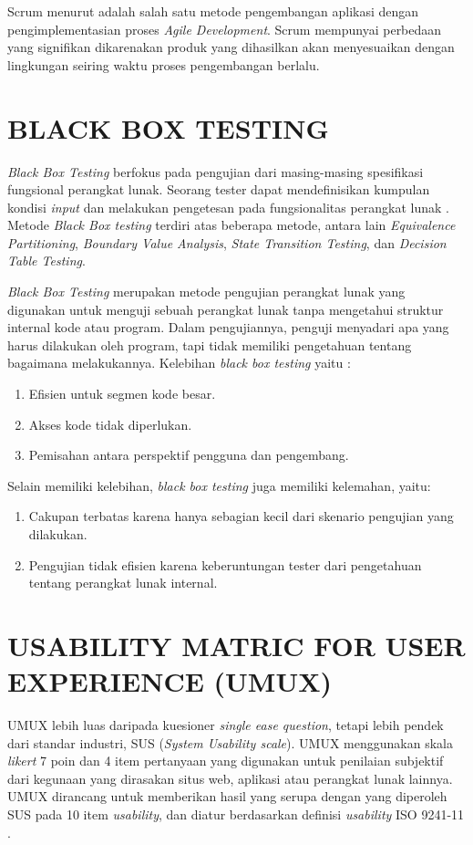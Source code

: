 \par Scrum menurut \citep{wahyudi2018analisis} adalah salah satu metode pengembangan aplikasi dengan pengimplementasian proses \textit{Agile Development}. Scrum mempunyai perbedaan yang signifikan dikarenakan produk yang dihasilkan akan menyesuaikan dengan lingkungan seiring waktu proses pengembangan berlalu.

\section{\uppercase{BLACK BOX TESTING}}
\textit{Black Box Testing} berfokus pada pengujian dari masing-masing spesifikasi fungsional perangkat lunak. Seorang tester dapat mendefinisikan kumpulan kondisi \textit{input} dan melakukan pengetesan pada fungsionalitas perangkat lunak \citep{mustaqbal2015pengujian}. Metode \textit{Black Box testing} terdiri atas beberapa metode, antara lain \textit{Equivalence Partitioning}, \textit{Boundary Value Analysis}, \textit{State Transition Testing}, dan \textit{Decision Table Testing}.

\par \textit{Black Box Testing} merupakan metode pengujian perangkat lunak yang digunakan untuk menguji sebuah perangkat lunak tanpa 
mengetahui struktur internal kode atau program. Dalam pengujiannya, penguji menyadari apa yang harus dilakukan oleh program, tapi tidak memiliki pengetahuan tentang bagaimana melakukannya. Kelebihan \textit{black box testing} yaitu :

\begin{enumerate}
	\item Efisien untuk segmen kode besar.
	\item Akses kode tidak diperlukan.
	\item Pemisahan antara perspektif pengguna dan pengembang.
\end{enumerate}

\par Selain memiliki kelebihan, \textit{black box testing} juga memiliki kelemahan, yaitu:

\begin{enumerate}
	\item Cakupan terbatas karena hanya sebagian kecil dari skenario pengujian yang dilakukan. 
	\item Pengujian tidak efisien karena keberuntungan tester dari pengetahuan tentang perangkat lunak internal.
\end{enumerate}

\section{\uppercase{USABILITY MATRIC FOR USER EXPERIENCE (UMUX)}}
UMUX lebih luas daripada kuesioner \textit{single ease question}, tetapi lebih pendek dari standar industri, SUS (\textit{System Usability scale}). UMUX menggunakan skala \textit{likert} 7 poin dan 4 item pertanyaan yang digunakan untuk penilaian subjektif dari kegunaan yang dirasakan situs web, aplikasi atau perangkat lunak lainnya. UMUX dirancang untuk memberikan hasil yang serupa dengan yang diperoleh SUS pada 10 item \textit{usability}, dan diatur berdasarkan definisi \textit{usability} ISO 9241-11 \citep{wahyuningrum2021buku}.

